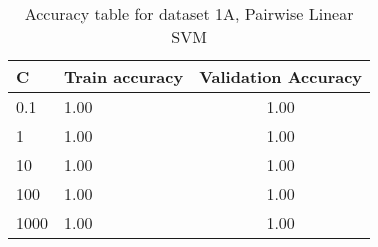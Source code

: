 \def\arraystretch{1.25}
\begin{table}[H]
\centering
\begin{tabular}{l l c}
\hline
\hline
\textbf{C} & \textbf{Train accuracy} & \textbf{Validation Accuracy} \\
\hline
\hline
0.1 & 1.00 & 1.00\\
1 & 1.00 & 1.00\\
10 & 1.00 & 1.00\\
100 & 1.00 & 1.00\\
1000 & 1.00 & 1.00\\
\hline
\end{tabular}
\caption{Accuracy table for dataset 1A, Pairwise Linear SVM}
\end{table}